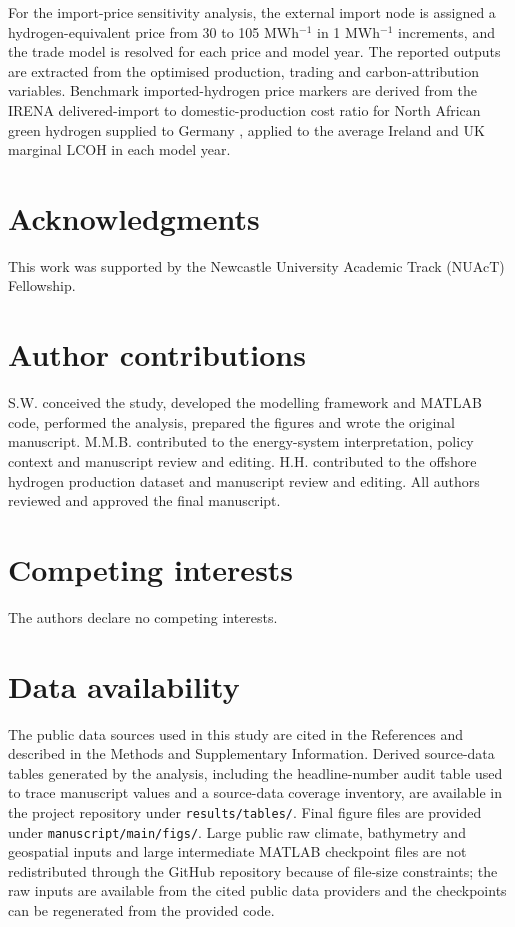 \documentclass[pdflatex,lineno,sn-mathphys,Numbered]{sn-jnl}%
\begin{document}
For the import-price sensitivity analysis, the external import node is assigned a hydrogen-equivalent price from 30 to 105 \texteuro{} MWh$^{-1}$ in 1 \texteuro{} MWh$^{-1}$ increments, and the trade model is resolved for each price and model year. The reported outputs are extracted from the optimised production, trading and carbon-attribution variables. Benchmark imported-hydrogen price markers are derived from the IRENA delivered-import to domestic-production cost ratio for North African green hydrogen supplied to Germany \cite{IRENAGlobalHydrogenTradeOutlook2022}, applied to the average Ireland and UK marginal LCOH in each model year.

\backmatter

\section*{Acknowledgments}

This work was supported by the Newcastle University Academic Track (NUAcT) Fellowship.

\section*{Author contributions}

S.W. conceived the study, developed the modelling framework and MATLAB code, performed the analysis, prepared the figures and wrote the original manuscript. M.M.B. contributed to the energy-system interpretation, policy context and manuscript review and editing. H.H. contributed to the offshore hydrogen production dataset and manuscript review and editing. All authors reviewed and approved the final manuscript.  

\section*{Competing interests}

The authors declare no competing interests.

\section*{Data availability}

The public data sources used in this study are cited in the References and described in the Methods and Supplementary Information. Derived source-data tables generated by the analysis, including the headline-number audit table used to trace manuscript values and a source-data coverage inventory, are available in the project repository under \verb|results/tables/|. Final figure files are provided under \verb|manuscript/main/figs/|. Large public raw climate, bathymetry and geospatial inputs and large intermediate MATLAB checkpoint files are not redistributed through the GitHub repository because of file-size constraints; the raw inputs are available from the cited public data providers and the checkpoints can be regenerated from the provided code.
\end{document}
